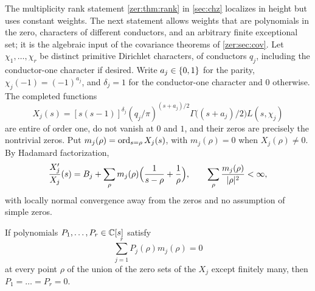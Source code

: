 The multiplicity rank statement \cref{zer:thm:rank} in \cref{sec:chz} localizes in height but
uses constant weights. The next statement allows
weights that are polynomials in the zero, characters of different conductors, and an
arbitrary finite exceptional set; it is the algebraic input of the covariance theorems of
\cref{zer:sec:cov}. Let $\chi_1,\dots,\chi_r$ be distinct primitive Dirichlet characters, of
conductors $q_j$, including the conductor-one character if desired. Write $a_j\in\{0,1\}$ for
the parity, $\chi_j(-1)=(-1)^{a_j}$, and $\delta_j=1$ for the conductor-one character and $0$
otherwise. The completed functions
\[
 X_j(s)=[s(s-1)]^{\delta_j}(q_j/\pi)^{(s+a_j)/2}\Gamma\bigl((s+a_j)/2\bigr)L(s,\chi_j)
\]
are entire of order one, do not vanish at $0$ and $1$, and their zeros are precisely the
nontrivial zeros. Put $m_j(\rho)=\operatorname{ord}_{s=\rho}X_j(s)$, with $m_j(\rho)=0$ when $X_j(\rho)\ne0$.
By Hadamard factorization,
\begin{equation}\label{zer:eq:hadamard}
 \frac{X_j'}{X_j}(s)=B_j+\sum_{\rho}m_j(\rho)\Bigl(\frac1{s-\rho}+\frac1\rho\Bigr),\qquad
 \sum_{\rho}\frac{m_j(\rho)}{\lvert\rho\rvert^2}<\infty,
\end{equation}
with locally normal convergence away from the zeros and no assumption of simple zeros.

\begin{theorem}\label{zer:thm:polyrigid}
If polynomials $P_1,\dots,P_r\in\mathbb{C}[s]$ satisfy
\[
 \sum_{j=1}^rP_j(\rho)m_j(\rho)=0
\]
at every point $\rho$ of the union of the zero sets of the $X_j$ except finitely many, then
$P_1=\dots=P_r=0$.
\end{theorem}

